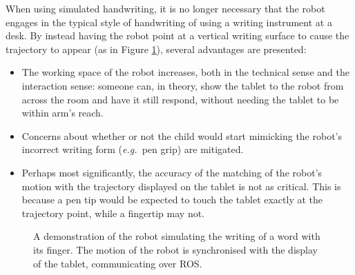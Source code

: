 \documentclass{sig-alternate}
\newcommand{\eg}{{\textit{e.g.~}}}
\begin{document}
When using simulated handwriting, it is no longer necessary that the robot
engages in the typical style of handwriting of using a writing instrument at a desk.
By instead having the robot point at a vertical writing surface to cause the
trajectory to appear (as in Figure \ref{fig:naoWriting}), several advantages are
presented:

\begin{itemize}

    \item The working space of the robot increases, both in the technical sense
        and the interaction sense: someone can, in theory, show the tablet to
        the robot from across the room and have it still respond, without
        needing the tablet to be within arm's reach.

    \item Concerns about whether or not the child would start mimicking the
        robot's incorrect writing form (\eg pen grip) are mitigated. 

    \item Perhaps most significantly, the accuracy of the matching of the
        robot's motion with the trajectory displayed on the tablet is not as
        critical. This is because a pen tip would be expected to touch the
        tablet exactly at the trajectory point, while a fingertip may not.

\end{itemize}

\begin{figure}[thpb]
     \begin{center}
%
    \end{center}
    \caption{A demonstration of the robot simulating the writing of a word with
    its finger. The motion of the robot is synchronised with the display of the
    tablet, communicating over ROS.\protect\footnotemark}%

   \label{fig:naoWriting}
\end{figure}
\end{document}
